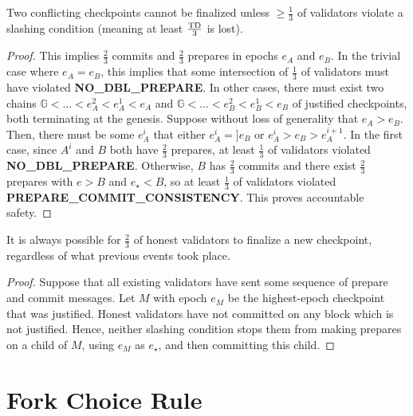 \documentclass[12pt, final]{article}
\newcommand{\epoch}{\ensuremath{e}\xspace}
\newcommand{\epochsource}{\ensuremath{\epoch_{\star}}\xspace}
\newcommand{\totaldeposit}{\textnormal{TD}\xspace}
\newcommand{\Genesisblock}{\ensuremath{\mathds{G}}\xspace}
\begin{document}
\begin{theorem}
\label{theorem:safety}
Two conflicting checkpoints cannot be finalized unless $\geq \frac{1}{3}$ of validators violate a slashing condition (meaning at least $\frac{\totaldeposit}{3}$ is lost).

\begin{proof}
This implies $\frac{2}{3}$ commits and $\frac{2}{3}$ prepares in epochs $\epoch_A$ and $e_B$. In the trivial case where $\epoch_A = \epoch_B$, this implies that some intersection of $\frac{1}{3}$ of validators must have violated \textbf{NO\_DBL\_PREPARE}. In other cases, there must exist two chains $\Genesisblock < \ldots < \epoch_A^2 < \epoch_A^1 < \epoch_A$ and $\Genesisblock < \ldots < \epoch_B^2 < \epoch_B^1 < \epoch_B$ of justified checkpoints, both terminating at the genesis. Suppose without loss of generality that $\epoch_A > \epoch_B$. Then, there must be some $\epoch_A^i$ that either $\epoch_A^i = ]\epoch_B$ or $\epoch_A^i > \epoch_B > \epoch_A^{i+1}$. In the first case, since $A^i$ and $B$ both have $\frac{2}{3}$ prepares, at least $\frac{1}{3}$ of validators violated \textbf{NO\_DBL\_PREPARE}. Otherwise, $B$ has $\frac{2}{3}$ commits and there exist $\frac{2}{3}$ prepares with $\epoch > B$ and $\epochsource < B$, so at least $\frac{1}{3}$ of validators violated \textbf{PREPARE\_COMMIT\_CONSISTENCY}. This proves accountable safety.
\end{proof}
\end{theorem}




\begin{theorem}
\label{theorem:liveness}
It is always possible for $\frac{2}{3}$ of honest validators to finalize a new checkpoint, regardless of what previous events took place.

\begin{proof}
Suppose that all existing validators have sent some sequence of prepare and commit messages. Let $M$ with epoch $\epoch_M$ be the highest-epoch checkpoint that was justified. Honest validators have not committed on any block which is not justified. Hence, neither slashing condition stops them from making prepares on a child of $M$, using $\epoch_M$ as $\epochsource$, and then committing this child.
\end{proof}

\end{theorem}

\section{Fork Choice Rule}
\label{sect:forkchoice}
\end{document}

